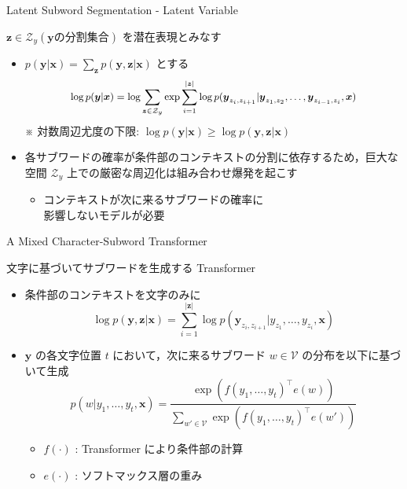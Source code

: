 \documentclass[unicode, 12pt, xdvipdfmx, aspectratio=43]{beamer}
\begin{document}
\begin{frame}[label={sec:org5330b8a}]{\normalsize Latent Subword Segmentation - Latent Variable}
\begin{block}{\(\boldsymbol{z} \in \mathcal{Z}_{y} (\boldsymbol{y} \text{の分割集合})\) を潜在表現とみなす}
\begin{itemize}
\item \(p(\boldsymbol{y} | \boldsymbol{x}) = \sum_{\boldsymbol{z}} p(\boldsymbol{y}, \boldsymbol{z} | \boldsymbol{x})\) とする
\begin{equation*}
  \small \log p(\boldsymbol{y} | \boldsymbol{x}) = \log\sum_{\boldsymbol{z}\in\mathcal{Z}_y}\exp\sum_{i=1}^{|\boldsymbol{z}|} \log p(\boldsymbol{y}_{z_i, z_{i+1}} | \boldsymbol{y}_{z_1, z_2},\ldots,\boldsymbol{y}_{z_{i-1}, z_i}, \boldsymbol{x})
\end{equation*}
※ 対数周辺尤度の下限: \(\log p(\boldsymbol{y} | \boldsymbol{x}) \ge \log p(\boldsymbol{y}, \boldsymbol{z} | \boldsymbol{x})\)

\item 各サブワードの確率が条件部のコンテキストの分割に依存するため，巨大な空間 \(\mathcal{Z}_y\) 上での厳密な周辺化は組み合わせ爆発を起こす
\begin{itemize}
\item コンテキストが次に来るサブワードの確率に \\ 影響しないモデルが必要
\end{itemize}
\end{itemize}
\end{block}
\end{frame}

\begin{frame}[label={sec:org11020e8}]{A Mixed Character-Subword Transformer}
\begin{block}{文字に基づいてサブワードを生成する Transformer}
\begin{itemize}
\item 条件部のコンテキストを文字のみに
\begin{equation*}
  \log p(\boldsymbol{y}, \boldsymbol{z} | \boldsymbol{x}) = \sum_{i=1}^{|\boldsymbol{z}|} \log p(\boldsymbol{y}_{z_i, z_{i+1}} | y_{z_1}, \ldots, y_{z_i}, \boldsymbol{x})
\end{equation*}

\item \(\boldsymbol{y}\) の各文字位置 \(t\) において，次に来るサブワード \(w \in \mathcal{V}\) の分布を以下に基づいて生成
\begin{equation*}
  p(w | y_{1}, \ldots, y_{t}, \boldsymbol{x}) = \frac{\exp(f(y_1,\ldots,y_t)^\top e(w))}{\sum_{w' \in \mathcal{V}}\exp(f(y_1,\ldots,y_t)^\top e(w'))}
\end{equation*}
\begin{itemize}
\item \vspace{-0.5cm} \(f(\cdot)\) : Transformer により条件部の計算
\item \(e(\cdot)\) : ソフトマックス層の重み
\end{itemize}
\end{itemize}
\end{block}
\end{frame}
\end{document}
